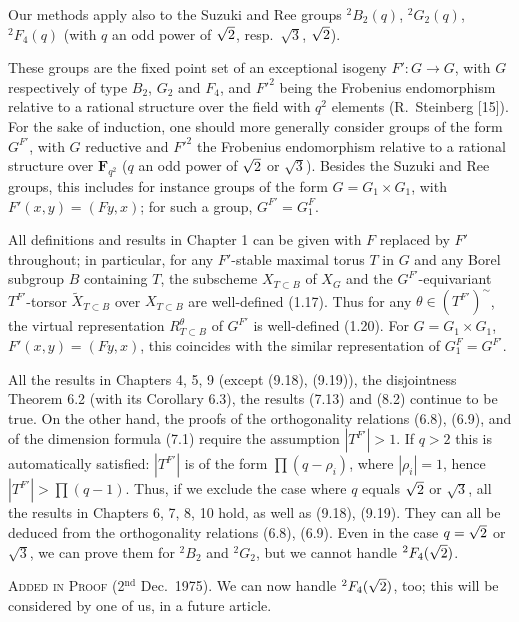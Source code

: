 \documentclass{amsart}
\theoremstyle{plain}
\theoremstyle{remark}
\begin{document}
Our methods apply also to the Suzuki and Ree groups ${}^2B_2(q)$, ${}^2G_2(q)$, ${}^2F_4(q)$ (with $q$ an odd power of $\sqrt{2\vphantom{3}}$, resp.\ $\sqrt{3}$, $\sqrt{2\vphantom{3}}$).

These groups are the fixed point set of an exceptional isogeny $F' \colon G \to G$, with $G$ respectively of type $B_2$, $G_2$ and $F_4$, and $F'^2$ being the Frobenius endomorphism relative to a rational structure over the field with $q^2$ elements (R.~Steinberg [15]). For the sake of induction, one should more generally consider groups of the form $G^{F'}$, with $G$ reductive and $F'^2$ the Frobenius endomorphism relative to a rational structure over $\mathbf{F}_{q^2}$ ($q$ an odd power of $\sqrt{2\vphantom{3}}$ or $\sqrt{3}$). Besides the Suzuki and Ree groups, this includes for instance groups of the form $G = G_1 \times G_1$, with $F'(x, y) = (Fy, x)$; for such a group, $G^{F'} = G_1^F$.

All definitions and results in Chapter 1 can be given with $F$ replaced by $F'$ throughout; in particular, for any $F'$-stable maximal torus $T$ in $G$ and any Borel subgroup $B$ containing $T$, the subscheme $X_{T \subset B}$ of $X_G$ and the $G^{F'}$-equivariant $T^{F'}$-torsor $\tilde{X}_{T \subset B}$ over $X_{T \subset B}$ are well-defined (1.17). Thus for any $\theta \in (T^{F'})^{\sim}$, the virtual representation $R_{T \subset B}^\theta$ of $G^{F'}$ is well-defined (1.20). For $G = G_1 \times G_1$, $F'(x, y) = (Fy, x)$, this coincides with the similar representation of $G_1^F = G^{F'}$.

All the results in Chapters 4, 5, 9 (except (9.18), (9.19)), the disjointness Theorem 6.2 (with its Corollary 6.3), the results (7.13) and (8.2) continue to be true. On the other hand, the proofs of the orthogonality relations (6.8), (6.9), and of the dimension formula (7.1) require the assumption $|T^{F'}| > 1$. If $q > 2$ this is automatically satisfied: $|T^{F'}|$ is of the form $\prod (q - \rho_i)$, where $|\rho_i| = 1$, hence $|T^{F'}| > \prod (q - 1)$. Thus, if we exclude the case where $q$ equals $\sqrt{2\vphantom{3}}$ or $\sqrt{3}$, all the results in Chapters 6, 7, 8, 10 hold, as well as (9.18), (9.19). They can all be deduced from the orthogonality relations (6.8), (6.9). Even in the case $q = \sqrt{2\vphantom{3}}$ or $\sqrt{3}$, we can prove them for ${}^2B_2$ and ${}^2G_2$, but we cannot handle ${}^2F_4(\sqrt{2\vphantom{3}})$.

\textsc{Added in Proof} (2$^{\text{nd}}$ Dec.\ 1975). We can now handle ${}^2F_4(\sqrt{2\vphantom{3}})$, too; this will be considered by one of us, in a future article.
\end{document}
